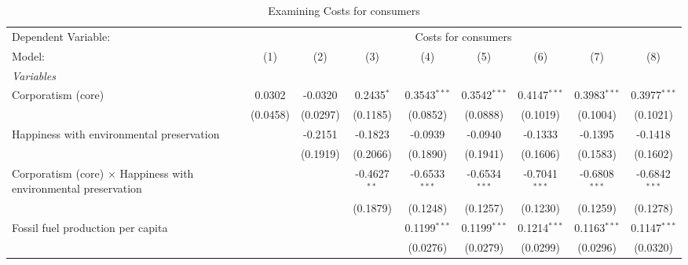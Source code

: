
\begin{table}[htbp]
   \caption{Examining Costs for consumers}
   \centering
   \begin{tabular}{lcccccccc}
      \tabularnewline \midrule \midrule
      Dependent Variable: & \multicolumn{8}{c}{Costs for consumers}\\
      Model:                                                                 & (1)      & (2)      & (3)            & (4)             & (5)                   & (6)             & (7)                  & (8)\\  
      \midrule
      \emph{Variables}\\
      Corporatism (core)                                                     & 0.0302   & -0.0320  & 0.2435$^{*}$   & 0.3543$^{***}$  & 0.3542$^{***}$        & 0.4147$^{***}$  & 0.3983$^{***}$       & 0.3977$^{***}$\\   
                                                                             & (0.0458) & (0.0297) & (0.1185)       & (0.0852)        & (0.0888)              & (0.1019)        & (0.1004)             & (0.1021)\\   
      Happiness with environmental preservation                              &          & -0.2151  & -0.1823        & -0.0939         & -0.0940               & -0.1333         & -0.1395              & -0.1418\\   
                                                                             &          & (0.1919) & (0.2066)       & (0.1890)        & (0.1941)              & (0.1606)        & (0.1583)             & (0.1602)\\   
      Corporatism (core) $\times$ Happiness with environmental preservation  &          &          & -0.4627$^{**}$ & -0.6533$^{***}$ & -0.6534$^{***}$       & -0.7041$^{***}$ & -0.6808$^{***}$      & -0.6842$^{***}$\\   
                                                                             &          &          & (0.1879)       & (0.1248)        & (0.1257)              & (0.1230)        & (0.1259)             & (0.1278)\\   
      Fossil fuel production per capita                                      &          &          &                & 0.1199$^{***}$  & 0.1199$^{***}$        & 0.1214$^{***}$  & 0.1163$^{***}$       & 0.1147$^{***}$\\   
                                                                             &          &          &                & (0.0276)        & (0.0279)              & (0.0299)        & (0.0296)             & (0.0320)\\   

\end{tabular}
\end{table}
